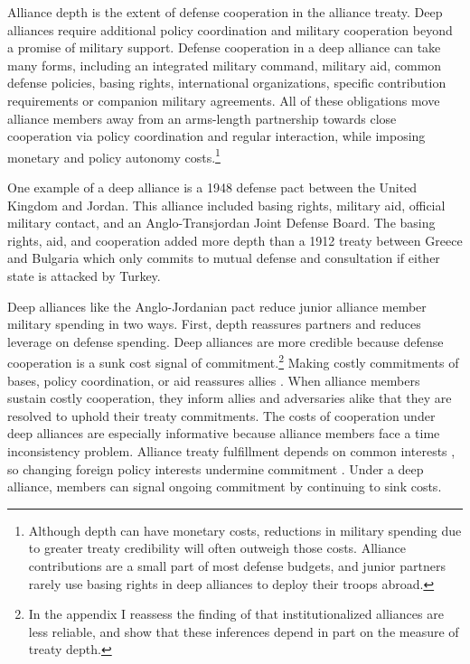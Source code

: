 \documentclass[12pt]{article}
\begin{document}
Alliance depth is the extent of defense cooperation in the alliance treaty. 
Deep alliances require additional policy coordination and military cooperation beyond a promise of military support.  
Defense cooperation in a deep alliance can take many forms, including an integrated military command, military aid, common defense policies, basing rights, international organizations, specific contribution requirements or companion military agreements. 
All of these obligations move alliance members away from an arms-length partnership towards close cooperation via policy coordination and regular interaction, while imposing monetary and policy autonomy costs.\footnote{Although depth can have monetary costs, reductions in military spending due to greater treaty credibility will often outweigh those costs. Alliance contributions are a small part of most defense budgets, and junior partners rarely use basing rights in deep alliances to deploy their troops abroad.} 

 
One example of a deep alliance is a 1948 defense pact between the United Kingdom and Jordan.
This alliance included basing rights, military aid, official military contact, and an Anglo-Transjordan Joint Defense Board.  
The basing rights, aid, and cooperation added more depth than a 1912 treaty between Greece and Bulgaria which only commits to mutual defense and consultation if either state is attacked by Turkey. 


Deep alliances like the Anglo-Jordanian pact reduce junior alliance member military spending in two ways. 
First, depth reassures partners and reduces leverage on defense spending.  
Deep alliances are more credible because defense cooperation is a sunk cost signal of commitment.\footnote{In the appendix I reassess the finding of \citet{LeedsAnac2005} that institutionalized alliances are less reliable, and show that these inferences depend in part on the measure of treaty depth.}
Making costly commitments of bases, policy coordination, or aid reassures allies \citep{Morrow1994}. 
When alliance members sustain costly cooperation, they inform allies and adversaries alike that they are resolved to uphold their treaty commitments. 
The costs of cooperation under deep alliances are especially informative because alliance members face a time inconsistency problem. 
Alliance treaty fulfillment depends on common interests \citep{Morrow2000, Leeds2003a}, so changing foreign policy interests undermine commitment \citep{LeedsSavun2007}. 
Under a deep alliance, members can signal ongoing commitment by continuing to sink costs.  
\end{document}
